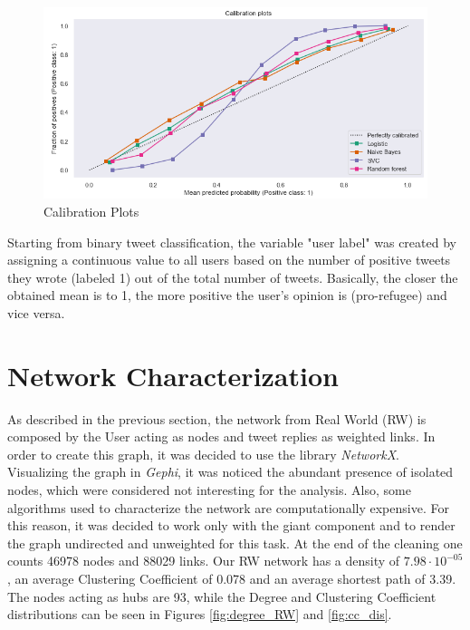 \documentclass[sigchi]{acmart}
\begin{document}
\begin{figure}[h]
    \centering
    \includegraphics[width=0.8\columnwidth]{report/img/calibration_plot.png}
    \caption{Calibration Plots}
    \label{fig:calplot}
\end{figure}

Starting from binary tweet classification, the variable "user label" was created by assigning a continuous value to all users based on the number of positive tweets they wrote (labeled 1) out of the total number of tweets. Basically, the closer the obtained mean is to 1, the more positive the user's opinion is (pro-refugee) and vice versa. 

\section{Network Characterization}

As described in the previous section, the network from Real World (RW) is composed by the User acting as nodes and tweet replies as weighted links. In order to create this graph, it was decided to use the library \textit{NetworkX}\cite{SciPyProceedings_11}. Visualizing the graph in \textit{Gephi}, it was noticed the abundant presence of isolated nodes, which were considered not interesting for the analysis. Also, some algorithms used to characterize the network are computationally expensive. For this reason, it was decided to work only with the giant component and to render the graph undirected and unweighted for this task.
At the end of the cleaning one counts 46978 nodes and 88029 links. 
Our RW network has a density of $7.98\cdot 10^{-05}$, an average Clustering Coefficient of 0.078 and an average shortest path of 3.39. The nodes acting as hubs are 93, while the Degree and Clustering Coefficient distributions can be seen in Figures \ref{fig:degree_RW} and \ref{fig:cc_dis}.
\end{document}
